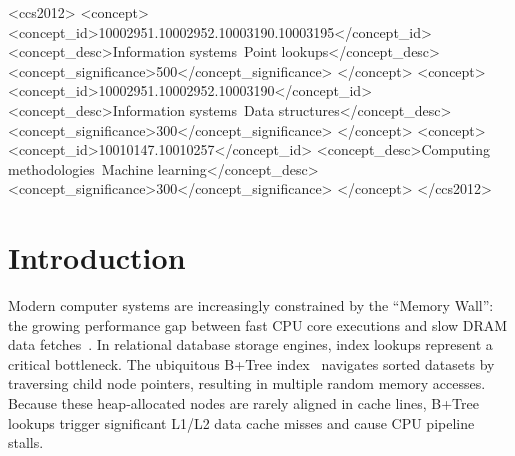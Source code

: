 \documentclass[sigconf,nonacm]{acmart}
\begin{document}
\begin{CCSXML}
<ccs2012>
   <concept>
       <concept_id>10002951.10002952.10003190.10003195</concept_id>
       <concept_desc>Information systems~Point lookups</concept_desc>
       <concept_significance>500</concept_significance>
       </concept>
   <concept>
       <concept_id>10002951.10002952.10003190</concept_id>
       <concept_desc>Information systems~Data structures</concept_desc>
       <concept_significance>300</concept_significance>
       </concept>
   <concept>
       <concept_id>10010147.10010257</concept_id>
       <concept_desc>Computing methodologies~Machine learning</concept_desc>
       <concept_significance>300</concept_significance>
       </concept>
 </ccs2012>
\end{CCSXML}



\maketitle

\section{Introduction}
Modern computer systems are increasingly constrained by the ``Memory Wall'': the growing performance gap between fast CPU core executions and slow DRAM data fetches~\cite{wulf1995hitting, hennessy2011computer}. In relational database storage engines, index lookups represent a critical bottleneck. The ubiquitous B+Tree index~\cite{comer1979ubiquitous} navigates sorted datasets by traversing child node pointers, resulting in multiple random memory accesses. Because these heap-allocated nodes are rarely aligned in cache lines, B+Tree lookups trigger significant L1/L2 data cache misses and cause CPU pipeline stalls.
\end{document}
